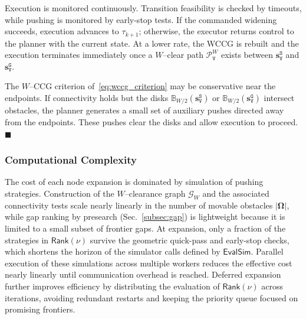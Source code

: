 Execution is monitored continuously. Transition feasibility is checked by
timeouts, while pushing is monitored by early-stop tests. If the commanded
widening succeeds, execution advances to $\tau_{k+1}$; otherwise, the
executor returns control to the planner with the current state. At a lower rate,
the WCCG is rebuilt and the execution terminates immediately once a
$W$--clear path $\mathcal{P}^W_\texttt{V}$ exists between
$\mathbf{s}_\texttt{V}^{\texttt{S}}$ and $\mathbf{s}_\texttt{V}^{\texttt{G}}$.

\begin{remark}
The $W$--CCG criterion of~\eqref{eq:wccg_criterion} may be conservative near
the endpoints. If connectivity holds but the disks
$\mathbb{B}_{W/2}(\mathbf{s}_\texttt{V}^{\texttt{S}})$ or
$\mathbb{B}_{W/2}(\mathbf{s}_\texttt{V}^{\texttt{G}})$ intersect obstacles, the
planner generates a small set of auxiliary pushes directed away from the
endpoints. These pushes clear the disks and allow execution to proceed.
\hfill$\blacksquare$
\end{remark}

\subsubsection{Computational Complexity}\label{subsubsec:complexity}
The cost of each node expansion is dominated by simulation of pushing
strategies. Construction of the $W$--clearance graph $\mathcal{G}_W$ and the
associated connectivity tests scale nearly linearly in the number of movable
obstacles $|\boldsymbol{\Omega}|$, while gap ranking by presearch
(Sec.~\ref{subsec:gap}) is lightweight because it is limited to a small subset
of frontier gaps. At expansion, only a fraction of the strategies in
$\mathsf{Rank}(\nu)$ survive the geometric quick-pass and early-stop checks,
which shortens the horizon of the simulator calls defined by
$\mathsf{EvalSim}$. Parallel execution of these simulations across multiple
workers reduces the effective cost nearly linearly until communication overhead
is reached. Deferred expansion further improves efficiency by distributing the
evaluation of $\mathsf{Rank}(\nu)$ across iterations, avoiding redundant
restarts and keeping the priority queue focused on promising frontiers.


